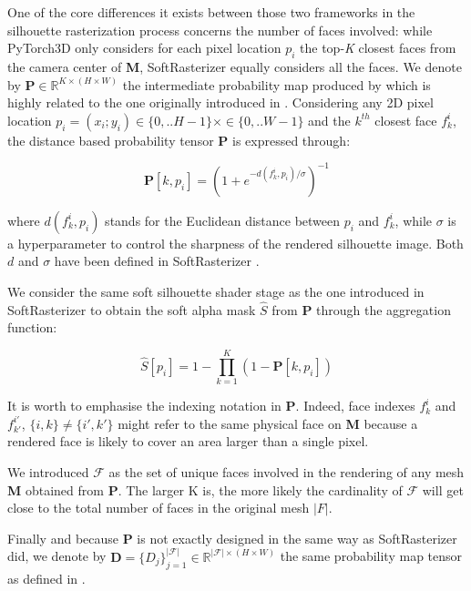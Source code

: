 One of the core differences it exists between those two frameworks in the silhouette rasterization process concerns the number of faces involved: while PyTorch3D only considers for each pixel location $p_i$ the top-\textit{K} closest faces from the camera center of \textbf{M}, SoftRasterizer equally considers all the faces. 
We denote by $\mathbf{P}\in \mathbb{R}^{K\times(H\times W)}$ the intermediate probability map produced by \citep{ravi2020accelarating} which is highly related to the one originally introduced in \citep{liu2019soft}. Considering any 2D pixel location $p_{i}=(x_{i};y_{i}) \in \{0,..H-1\}\times\in \{0,..W-1\} $ and the $k^{th}$ closest face $f_{k}^{i}$, the distance based probability tensor $\mathbf{P}$ is expressed through:

\begin{equation}
    \mathbf{P}[k,p_{i}]=\left(1+e^{-d(f_{k}^{i},p_{i})/\sigma}\right)^{-1} 
\end{equation}

where $d(f_{k}^{i},p_{i})$ stands for the Euclidean distance between $p_i$ and $f_{k}^{i}$, while $\sigma$ is a hyperparameter to control the sharpness of the rendered silhouette image. Both $d$ and $\sigma$ have been defined in SoftRasterizer \citep{liu2019soft}. \newline

We consider the same soft silhouette shader stage as the one introduced in SoftRasterizer to obtain the soft alpha mask $\hat{S}$ from $\mathbf{P}$ through the aggregation function:

\begin{equation}
    \hat{S}[p_i]=1 - \prod_{k=1}^{K} (1 - \mathbf{P}[k,p_{i}])
\end{equation}

It is worth to emphasise the indexing notation in $\mathbf{P}$. Indeed, face indexes $f_{k}^{i}$ and $f_{k'}^{i'}$, $\{i,k\} \neq \{i',k'\}$ might refer to the same physical face on \textbf{M} because a rendered face is likely to cover an area larger than a single pixel. 

We introduced $\mathcal{F}$ as the set of unique faces involved in the rendering of any mesh \textbf{M} obtained from $\mathbf{P}$. The larger K is, the more likely the cardinality of $\mathcal{F}$ will get close to the total number of faces in the original mesh $|F|$. 

Finally and because $\mathbf{P}$ is not exactly designed in the same way as SoftRasterizer did, we denote by $\mathbf{D}=\{D_{j}\}_{j=1}^{|\mathcal{F}|}\in \mathbb{R}^{|\mathcal{F}|\times(H\times W)}$ the same probability map tensor as defined in \citep{liu2019soft}.

